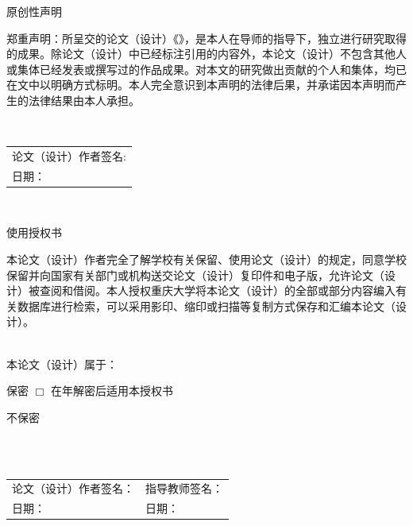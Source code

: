 \clearpage
\thispagestyle{empty}

{}
\begin{center}
\heiti {}
原创性声明
\end{center}

\thesisbodyfont
郑重声明：所呈交的论文（设计）《\CJKunderline*{\thesismaintitlecn}》，是本人在导师的指导下，独立进行研究取得的成果。除论文（设计）中已经标注引用的内容外，本论文（设计）不包含其他人或集体已经发表或撰写过的作品成果。对本文的研究做出贡献的个人和集体，均已在文中以明确方式标明。本人完全意识到本声明的法律后果，并承诺因本声明而产生的法律结果由本人承担。

~\\
\begin{flushleft}
\begin{tabular}{l}
\thesisbodyfont
论文（设计）作者签名: \underline{\hspace{6em}}\\
\thesisbodyfont
日期：\underline{\hspace{6em}}
\end{tabular}
\end{flushleft}

~\\
\begin{center}
\heiti {}
使用授权书
\end{center}

\thesisbodyfont
本论文（设计）作者完全了解学校有关保留、使用论文（设计）的规定，同意学校保留并向国家有关部门或机构送交论文（设计）复印件和电子版，允许论文（设计）被查阅和借阅。本人授权重庆大学将本论文（设计）的全部或部分内容编入有关数据库进行检索，可以采用影印、缩印或扫描等复制方式保存和汇编本论文（设计）。

~\\
\thesisbodyfont
本论文（设计）属于：\par
保\quad 密 $\Box$  \quad 在\underline{\qquad}年解密后适用本授权书\par
不保密 \checkedbox

~\\
~\\
\begin{flushleft}
\thesisbodyfont
\begin{tabular*}{\textwidth}{@{\extracolsep{\fill}}ll}
论文（设计）作者签名：\underline{\hspace{6em}} & 指导教师签名：\underline{\hspace{6em}} \\
日期：\underline{\hspace{6em}} &日期：\underline{\hspace{6em}}\\
\end{tabular*}
\end{flushleft}
